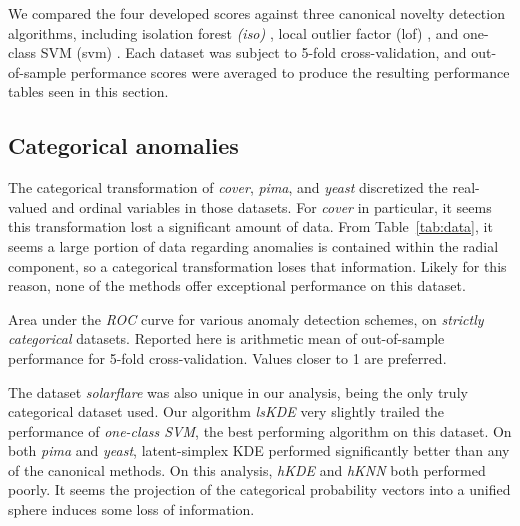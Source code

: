 We compared the four developed scores against three canonical novelty detection 
    algorithms, including isolation forest \emph{(iso)} \cite{liu2000}, local 
    outlier factor (lof) \cite{breunig2000}, and one-class SVM (svm) 
    \cite{chang2011}.  Each dataset was subject to 5-fold cross-validation, and 
    out-of-sample performance scores were averaged to produce the resulting 
    performance tables seen in this section.

\subsection{Categorical anomalies}
The categorical transformation of \emph{cover}, \emph{pima}, and \emph{yeast}
    discretized the real-valued and ordinal variables in those datasets.  For 
    \emph{cover} in particular, it seems this transformation lost a significant 
    amount of data.  From Table~\ref{tab:data}, it seems a large portion of 
    data regarding anomalies is contained within the radial component, so a 
    categorical transformation loses that information.  Likely for this reason, 
    none of the methods offer exceptional performance on this dataset.
\begin{table}[ht]
    \centering
    \caption{Area under the \emph{ROC} curve for various anomaly detection 
        schemes, on \emph{strictly categorical} datasets.  Reported here is 
        arithmetic mean of out-of-sample performance for 5-fold cross-validation.  
        Values closer to 1 are preferred.\label{tab:perfcat}}
    \bigskip
    
\end{table}
The dataset \emph{solarflare} was also unique in our analysis, being the only 
    truly categorical dataset used.  Our algorithm \emph{lsKDE} very slightly 
    trailed the performance of \emph{one-class SVM}, the best performing 
    algorithm on this dataset.  On both \emph{pima} and \emph{yeast}, 
    latent-simplex KDE performed significantly better than any of the canonical 
    methods.  On this analysis, \emph{hKDE} and \emph{hKNN} both performed 
    poorly.  It seems the projection of the categorical probability vectors into 
    a unified sphere induces some loss of information.

